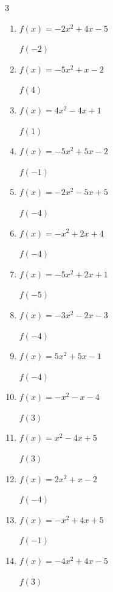 \begin{multicols}{3}
\begin{enumerate}
\columnbreak %

  \item $f(x)=-2x^{2}+4x-5$

$f(-2)$
        \phantom{$= -21$}

  \item $f(x)=-5x^{2}+x-2$

$f(4)$
        \phantom{$= -78$}

  \item $f(x)=4x^{2}-4x+1$

$f(1)$
        \phantom{$= 1$}

  \item $f(x)=-5x^{2}+5x-2$

$f(-1)$
        \phantom{$= -12$}

  \item $f(x)=-2x^{2}-5x+5$

$f(-4)$
        \phantom{$= -7$}

  \item $f(x)=-x^{2}+2x+4$

$f(-4)$
        \phantom{$= -20$}

  \item $f(x)=-5x^{2}+2x+1$

$f(-5)$
        \phantom{$= -134$}

  \item $f(x)=-3x^{2}-2x-3$

$f(-4)$
        \phantom{$= -43$}

  \item $f(x)=5x^{2}+5x-1$

$f(-4)$
        \phantom{$= 59$}

  \item $f(x)=-x^{2}-x-4$

$f(3)$
        \phantom{$= -16$}

  \item $f(x)=x^{2}-4x+5$

$f(3)$
        \phantom{$= 2$}

  \item $f(x)=2x^{2}+x-2$

$f(-4)$
        \phantom{$= 26$}

  \item $f(x)=-x^{2}+4x+5$

$f(-1)$
        \phantom{$= 0$}

  \item $f(x)=-4x^{2}+4x-5$

$f(3)$
        \phantom{$= -29$}


\end{enumerate}
\end{multicols}
